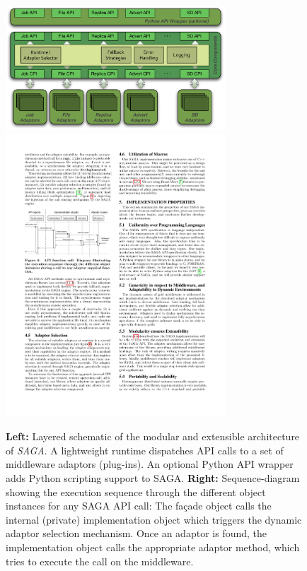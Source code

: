 \documentclass[a4paper,10pt]{article}
\newcommand{\B}[1]{\textbf{#1}}
\newcommand{\sagaimpl}{\textit{SAGA}\xspace}
\newcommand{\impl}{\sagaimpl}
\begin{document}
\begin{figure}%
  \centering
  \includegraphics[width=3.23in]{./figures/saga-architecture}
  \includegraphics[width=3.23in]{./figures/saga-call-dispatch}

 \vspace{-1em}	
  \caption{\footnotesize \B{Left:} Layered schematic of the modular and extensible architecture of \impl. A lightweight runtime dispatches API calls to a set of middleware adaptors (plug-ins). An optional Python API wrapper adds Python scripting support to SAGA.
   \B{Right: } Sequence-diagram showing the execution sequence through the different object instances for any SAGA API call: The fa\c{c}ade object calls the internal (private) implementation object which triggers the dynamic adaptor selection mechanism. Once an adaptor is found, the implementation object calls the appropriate adaptor method, which tries to execute the call on the middleware. }
    
  \label{fig:saga_arch}
\end{figure}


  
 
\end{document}

